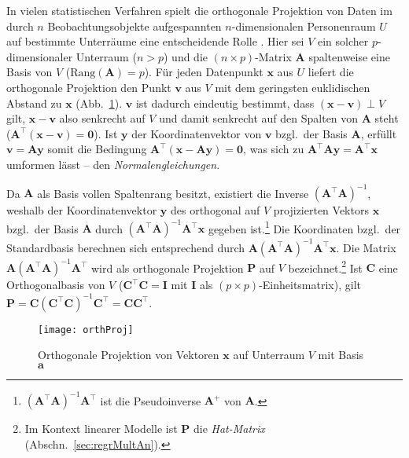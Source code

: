 In vielen statistischen Verfahren spielt die orthogonale Projektion von Daten im durch $n$ Beobachtungsobjekte aufgespannten $n$-dimensionalen Personenraum $U$ auf bestimmte Unterräume eine entscheidende Rolle \cite{Wickens2015}. Hier sei $V$ ein solcher $p$-dimensionaler Unterraum ($n > p$) und die $(n \times p)$-Matrix $\bm{A}$ spaltenweise eine Basis von $V$ ($\text{Rang}(\bm{A}) = p$). Für jeden Datenpunkt $\bm{x}$ aus $U$ liefert die orthogonale Projektion den Punkt $\bm{v}$ aus $V$ mit dem geringsten euklidischen Abstand zu $\bm{x}$ (Abb.\ \ref{fig:orthProj}). $\bm{v}$ ist dadurch eindeutig bestimmt, dass $(\bm{x} - \bm{v}) \perp V$ gilt, $\bm{x} - \bm{v}$ also senkrecht auf $V$ und damit senkrecht auf den Spalten von $\bm{A}$ steht ($\bm{A}^{\top} (\bm{x} - \bm{v}) = \bm{0}$). Ist $\bm{y}$ der Koordinatenvektor von $\bm{v}$ bzgl.\ der Basis $\bm{A}$, erfüllt $\bm{v} = \bm{A} \bm{y}$ somit die Bedingung $\bm{A}^{\top} (\bm{x} - \bm{A} \bm{y}) = \bm{0}$, was sich zu $\bm{A}^{\top} \bm{A} \bm{y} = \bm{A}^{\top} \bm{x}$ umformen lässt -- den \emph{Normalengleichungen}.

Da $\bm{A}$ als Basis vollen Spaltenrang besitzt, existiert die Inverse $(\bm{A}^{\top} \bm{A})^{-1}$, weshalb der Koordinatenvektor $\bm{y}$ des orthogonal auf $V$ projizierten Vektors $\bm{x}$ bzgl.\ der Basis $\bm{A}$ durch $(\bm{A}^{\top} \bm{A})^{-1} \bm{A}^{\top} \bm{x}$ gegeben ist.\footnote{$(\bm{A}^{\top} \bm{A})^{-1} \bm{A}^{\top}$ ist die Pseudoinverse $\bm{A}^{+}$ von $\bm{A}$.} Die Koordinaten bzgl.\ der Standardbasis berechnen sich entsprechend durch $\bm{A} (\bm{A}^{\top} \bm{A})^{-1} \bm{A}^{\top} \bm{x}$. Die Matrix $\bm{A} (\bm{A}^{\top} \bm{A})^{-1} \bm{A}^{\top}$ wird als orthogonale Projektion $\bm{P}$ auf $V$ bezeichnet.\footnote{Im Kontext linearer Modelle ist $\bm{P}$ die \emph{Hat-Matrix} (Abschn.\ \ref{sec:regrMultAn}).} Ist $\bm{C}$ eine Orthogonalbasis von $V$ ($\bm{C}^{\top} \bm{C} = \bm{I}$ mit $\bm{I}$ als $(p \times p)$-Einheitsmatrix), gilt $\bm{P} = \bm{C} (\bm{C}^{\top} \bm{C})^{-1} \bm{C}^{\top} = \bm{C} \bm{C}^{\top}$.

\begin{figure}[ht]
\centering
\texttt{[image: orthProj]}
\vspace*{-1em}
\caption{Orthogonale Projektion von Vektoren $\bm{x}$ auf Unterraum $V$ mit Basis $\bm{a}$}
\label{fig:orthProj}
\end{figure}

